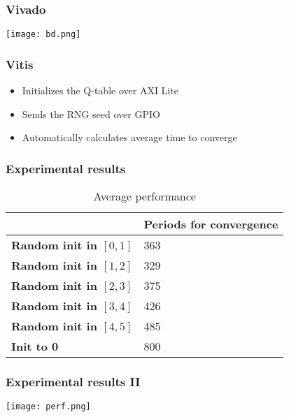 \documentclass{beamer}
\begin{document}
\begin{frame}
	\frametitle{Vivado}
	{

		\centering

		\texttt{[image: bd.png]}

	}
\end{frame}
\begin{frame}
	\frametitle{Vitis}
	\begin{itemize}
		\item Initializes the Q-table over AXI Lite
		\item Sends the RNG seed over GPIO
		\item Automatically calculates average time to converge
	\end{itemize}
\end{frame}
\begin{frame}
	\frametitle{Experimental results}
	\begin{table}[h!]

\centering


\begin{tabular}{|l |l|}
  \hline & \textbf{Periods for convergence} \\ \hline
    \textbf{Random init in $[0, 1]$}             &  363                                                               \\ \hline
    \textbf{Random init in $[1, 2]$} &  329                                                               \\ \hline
    \textbf{Random init in $[2, 3]$} &  375                                                               \\ \hline
    \textbf{Random init in $[3, 4]$} &  426                                                               \\ \hline
    \textbf{Random init in $[4, 5]$} &  485                                                               \\ \hline
  \textbf{Init to 0}                 &  800                                                               \\ \hline
  \end{tabular}
  \caption{Average performance}
  \label{table:perf}
  \end{table}
\end{frame}
\begin{frame}
	\frametitle{Experimental results II}

	{

		\centering

		\texttt{[image: perf.png]}

	}
\end{frame}
%	
%	
\end{document}
